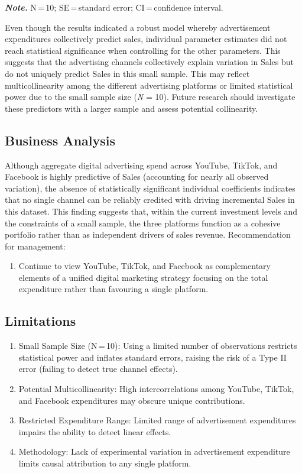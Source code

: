 \documentclass[
]{article}
\providecommand{\tightlist}{%
  \setlength{\itemsep}{0pt}\setlength{\parskip}{0pt}}
\begin{document}
\textbf{\emph{Note.}} N\,=\,10; SE\,=\,standard error; CI\,=\,confidence
interval.

Even though the results indicated a robust model whereby advertisement
expenditures collectively predict sales, individual parameter estimates
did not reach statistical significance when controlling for the other
parameters. This suggests that the advertising channels collectively
explain variation in Sales but do not uniquely predict Sales in this
small sample. This may reflect multicollinearity among the different
advertising platforms or limited statistical power due to the small
sample size (\emph{N} = 10). Future research should investigate these
predictors with a larger sample and assess potential collinearity.

\subsection{Business Analysis}\label{business-analysis}

Although aggregate digital advertising spend across YouTube, TikTok, and
Facebook is highly predictive of Sales (accounting for nearly all
observed variation), the absence of statistically significant individual
coefficients indicates that no single channel can be reliably credited
with driving incremental Sales in this dataset. This finding suggests
that, within the current investment levels and the constraints of a
small sample, the three platforms function as a cohesive portfolio
rather than as independent drivers of sales revenue. Recommendation for
management:

\begin{enumerate}
\def\labelenumi{\arabic{enumi}.}
\tightlist
\item
  Continue to view YouTube, TikTok, and Facebook as complementary
  elements of a unified digital marketing strategy focusing on the total
  expenditure rather than favouring a single platform.
\end{enumerate}

\subsection{Limitations}\label{limitations}

\begin{enumerate}
\def\labelenumi{\arabic{enumi}.}
\item
  Small Sample Size (N\,=\,10): Using a limited number of observations
  restricts statistical power and inflates standard errors, raising the
  risk of a Type II error (failing to detect true channel effects).
\item
  Potential Multicollinearity: High intercorrelations among YouTube,
  TikTok, and Facebook expenditures may obscure unique contributions.
\item
  Restricted Expenditure Range: Limited range of advertisement
  expenditures impairs the ability to detect linear effects.
\item
  Methodology: Lack of experimental variation in advertisement
  expenditure limits causal attribution to any single platform.
\end{enumerate}
\end{document}
